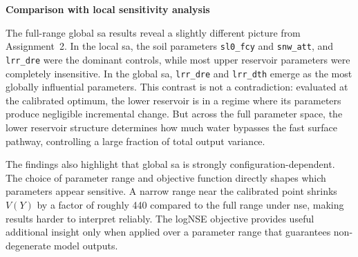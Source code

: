 \vspace{0.5cm}
\noindent\textbf{Comparison with local sensitivity analysis}

The full-range global \ac{sa} results reveal a slightly different picture from Assignment~2. In the local \ac{sa}, the soil parameters \texttt{sl0\_fcy} and \texttt{snw\_att}, and \texttt{lrr\_dre} were the dominant controls, while most upper reservoir parameters were completely insensitive. In the global \ac{sa}, \texttt{lrr\_dre} and \texttt{lrr\_dth} emerge as the most globally influential parameters. This contrast is not a contradiction: evaluated at the calibrated optimum, the lower reservoir is in a regime where its parameters produce negligible incremental change. But across the full parameter space, the lower reservoir structure determines how much water bypasses the fast surface pathway, controlling a large fraction of total output variance.

The findings also highlight that global \ac{sa} is strongly configuration-dependent. The choice of parameter range and objective function directly shapes which parameters appear sensitive. A narrow range near the calibrated point shrinks $V(Y)$ by a factor of roughly 440 compared to the full range under \ac{nse}, making results harder to interpret reliably. The logNSE objective provides useful additional insight only when applied over a parameter range that guarantees non-degenerate model outputs.
